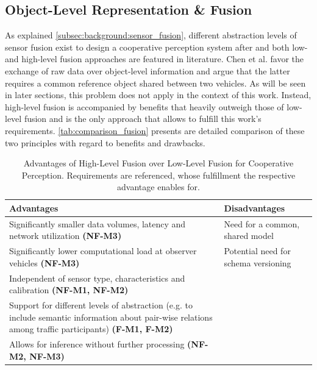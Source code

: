 \subsection{Object-Level Representation \& Fusion}
\label{subsec:concept_design:object_level_representation_fusion}
As explained \autoref{subsec:background:sensor_fusion}, different abstraction levels of sensor fusion exist to design a cooperative perception system after and both low- and high-level fusion approaches are featured in literature. Chen et al. \cite{Chen2019} favor the exchange of raw data over object-level information and argue that the latter requires a common reference object shared between two vehicles. As will be seen in later sections, this problem does not apply in the context of this work. Instead, high-level fusion is accompanied by benefits that heavily outweigh those of low-level fusion and is the only approach that allows to fulfill this work's requirements. \autoref{tab:comparison_fusion} presents are detailed comparison of these two principles with regard to benefits and drawbacks.

\begin{table}[H]
	\centering
	\begin{tabular}{|p{7.5cm}|p{7.5cm}|}
		\hline
		\textbf{Advantages} & \textbf{Disadvantages} \\ \hline
		Significantly smaller data volumes, latency and network utilization \textbf{(NF-M3)} & Need for a common, shared model \\ \hline
		Significantly lower computational load at observer vehicles \textbf{(NF-M3)} & Potential need for schema versioning \\ \hline
		Independent of sensor type, characteristics and calibration \textbf{(NF-M1, NF-M2)} & \multirow{3}{*}{} \\ \cline{1-1}
		Support for different levels of abstraction (e.g. to include semantic information about pair-wise relations among traffic participants) \textbf{(F-M1, F-M2)} &  \\ \cline{1-1}
		Allows for inference without further processing \textbf{(NF-M2, NF-M3)} &  \\ \hline
	\end{tabular}
	\caption[Comparison High-/Low Level Fusion]{Advantages of High-Level Fusion over Low-Level Fusion for Cooperative Perception. Requirements are referenced, whose fulfillment the respective advantage enables for.}
	\label{tab:comparison_fusion}
\end{table}

